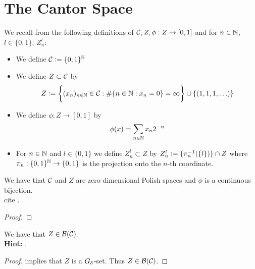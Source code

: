 \documentclass{book}
\begin{document}
	\newpage
	\section{The Cantor Space}
	
	
	\begin{defn}  
		We recall from  the following definitions of $\mathcal{C}, Z, \phi:Z \rightarrow [0,1]$ and for $n \in \mathbb{N}$, $l \in \{0,1\}$, $Z_n^l$: 
		\begin{itemize}
			\item We define $\mathcal{C} \vcentcolon= \{0,1\}^{\mathbb{N}}$
			\item We define $Z \subset \mathcal{C}$ by 
			$$Z \vcentcolon= \bigg \{(x_n)_{n \in \mathbb{N}} \in \mathcal{C}: \# \{n \in \mathbb{N}: x_n = 0\} = \infty  \bigg \} \cup \{(1, 1, 1, \ldots)\}$$ 
			\item We define $\phi: Z \rightarrow [0,1]$ by 
			$$\phi(x) = \sum\limits_{n \in \mathbb{N}} x_n2^{-n}$$
			\item For $n \in \mathbb{N}$ and $l \in \{0,1\}$ we define $Z_n^l \subset Z$ by $Z_n^l \vcentcolon= \{\pi_n^{-1}(\{l\})\} \cap Z$ where $\pi_n: \{0,1 \}^{\mathbb{N}} \rightarrow \{0,1\}$ is the projection onto the $n$-th coordinate.
		\end{itemize}
	\end{defn}

	\begin{ex}  
		We have that $\mathcal{C}$ and $Z$ are zero-dimensional Polish spaces and $\phi$ is a continuous bijection. \\
		 cite .
	\end{ex}

	\begin{proof}
	\end{proof}
	
	\begin{ex}  
		We have that $Z \in \mathcal{B}(\mathcal{C})$. \\
		\textbf{Hint:} . 
	\end{ex}
	
	\begin{proof}
		 implies that $Z$ is a $G_{\delta}$-set. Thus $Z \in \mathcal{B}(\mathcal{C})$. 
	\end{proof}
	
\end{document}
